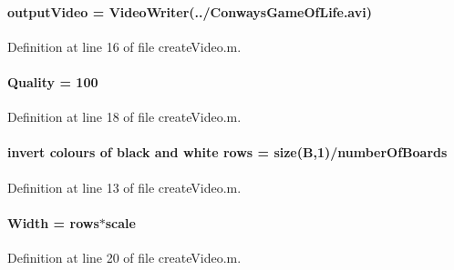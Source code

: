 \paragraph[{output\+Video}]{\setlength{\rightskip}{0pt plus 5cm}output\+Video = Video\+Writer(\textquotesingle{}../Conways\+Game\+Of\+Life.\+avi\textquotesingle{})}\label{a00099_a90c346df14c7ec8c77240e20732f2ac1}


Definition at line 16 of file create\+Video.\+m.

\hypertarget{a00099_ac6ff3e0e8f9b0c2916f1f686c39ea2af}{}
\paragraph[{Quality}]{ Quality = 100}\label{a00099_ac6ff3e0e8f9b0c2916f1f686c39ea2af}


Definition at line 18 of file create\+Video.\+m.

\hypertarget{a00099_ab56a9d9a5877fa9746152fae2c6a74dc}{}
\paragraph[{rows}]{\setlength{\rightskip}{0pt plus 5cm}invert colours of black and white rows = size({\bf B},1)/{\bf number\+Of\+Boards}}\label{a00099_ab56a9d9a5877fa9746152fae2c6a74dc}


Definition at line 13 of file create\+Video.\+m.

\hypertarget{a00099_a82f73784da270910a261ea2f2f89b249}{}
\paragraph[{Width}]{ Width = {\bf rows}$\ast$scale}\label{a00099_a82f73784da270910a261ea2f2f89b249}


Definition at line 20 of file create\+Video.\+m.

